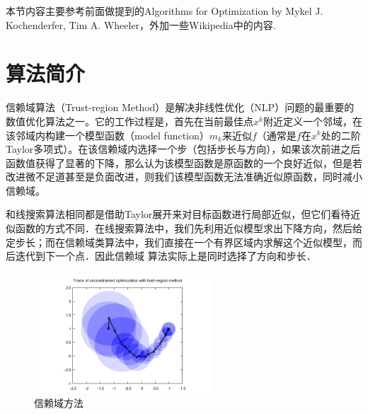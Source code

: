 本节内容主要参考前面做提到的Algorithms for Optimization by Mykel J. Kochenderfer, Tim A. Wheeler，外加一些Wikipedia中的内容.
\section{算法简介}
信赖域算法（Trust-region Method）是解决非线性优化（NLP）问题的最重要的数值优化算法之一。它的工作过程是，首先在当前最佳点$x^k$附近定义一个邻域，在该邻域内构建一个模型函数（model function）$m_k$来近似$f$（通常是$f$在$x^k$处的二阶Taylor多项式）。在该信赖域内选择一个步（包括步长与方向），如果该次前进之后函数值获得了显著的下降，那么认为该模型函数是原函数的一个良好近似，但是若改进微不足道甚至是负面改进，则我们该模型函数无法准确近似原函数，同时减小信赖域。\par 和线搜索算法相同都是借助Taylor展开来对目标函数进行局部近似，但它们看待近似函数的方式不同．在线搜索算法中，我们先利用近似模型求出下降方向，然后给定步长；而在信赖域类算法中，我们直接在一个有界区域内求解这个近似模型，而后迭代到下一个点．因此信赖域
算法实际上是同时选择了方向和步长．
\begin{figure}[h!]
\caption{信赖域方法}
\centering
\includegraphics[width=0.6\textwidth]{img/TRM.png}
\end{figure}
